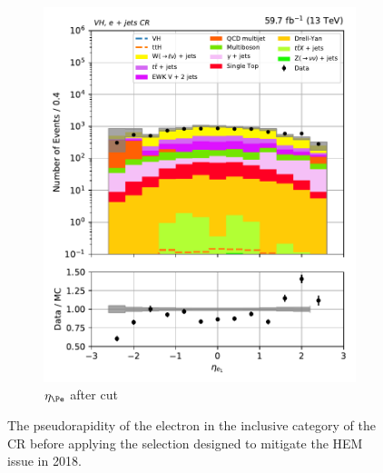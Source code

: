 \begin{figure}[htbp]
\begin{subfigure}[b]{0.34\textwidth}
        \includegraphics[width=\textwidth]{figures/hem_issue/region_3/leadLepton_eta/leadLepton_eta_VH_after.pdf}
        \caption{$\eta_{\Pe}$ after cut}
    \end{subfigure}
    \caption[The pseudorapidity of the electron in the \VH inclusive category of the \singleEleCr \gls{CR} before applying the selection designed to mitigate the HEM issue in 2018]{The pseudorapidity of the electron in the \VH inclusive category of the \singleEleCr \gls{CR} before applying the selection designed to mitigate the HEM issue in 2018.}
    \label{fig:htoinv_hem_issue_lepton_eta}
\end{figure}

